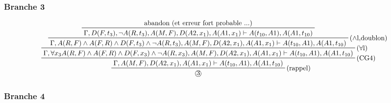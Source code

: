 \documentclass[10pt]{extarticle}
\begin{document}
\begin{landscape}
\subsubsection*{Branche \textcircled{3}}

\begin{displaymath}
\prftree[r]{(rappel)}
{\prftree[r]{(CG4)}
{\prftree[r]{($\forall$l)}
{\prftree[r]{($\land$l,doublon)}
{\prftree[r]{}
{\text{abandon (et erreur fort probable ...)}}
{\Gamma , D(F,t_3) , \neg A(R,t_3) , A(M,F) , D(A2,x_1) , A(A1,x_1) \vdash A(t_{10},A1) , A(A1,t_{10})}}
{\Gamma , A(R,F) \land A(F,R) \land D(F,t_3) \land \neg A(R,t_3) , A(M,F) , D(A2,x_1) , A(A1,x_1) \vdash A(t_{10},A1) , A(A1,t_{10})}}
{\Gamma , \forall x_3 A(R,F) \land A(F,R) \land D(F,x_3) \land \neg A(R,x_3) , A(M,F) , D(A2,x_1) , A(A1,x_1) \vdash A(t_{10},A1) , A(A1,t_{10})}}
{\Gamma , A(M,F) , D(A2,x_1) , A(A1,x_1) \vdash A(t_{10},A1) , A(A1,t_{10})}}
{\text{\textcircled{3}}}
\end{displaymath}

\subsubsection*{Branche \textcircled{4}}


\end{landscape}
\end{document}
